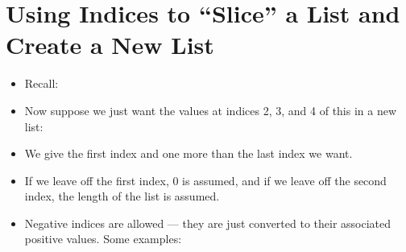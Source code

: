 \documentclass[letterpaper,10pt,english]{sphinxmanual}
\begin{document}
\section{Using Indices to “Slice” a List and Create a New List}
\label{\detokenize{lecture_notes/lec10_lists2:using-indices-to-slice-a-list-and-create-a-new-list}}\begin{itemize}
\item {} 
Recall:

\begin{sphinxVerbatim}[commandchars=\\\{\}]
  \PYG{p}{[}     \PYGZbs{}
       \PYG{p}{]}
\end{sphinxVerbatim}

\item {} 
Now suppose we just want the values at indices 2, 3, and 4 of this in
a new list:

\begin{sphinxVerbatim}[commandchars=\\\{\}]
  \PYG{p}{[}\PYG{p}{]}
\PYG{g+go}{[320.03, 322.16, 328.07, 333.91, 341.47, 348.92, 357.29, 363.77,}
\PYG{g+go}{   371.51, 382.47, 392.95]}
\end{sphinxVerbatim}

\item {} 
We give the first index and one more than the last index we want.

\item {} 
If we leave off the first index, 0 is assumed, and if we leave off
the second index, the length of the list is assumed.

\item {} 
Negative indices are allowed — they are just converted to their
associated positive values. Some examples:


\end{itemize}
\end{document}
